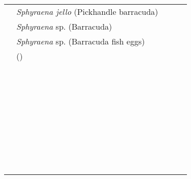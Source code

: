 \documentclass[12pt]{article}
\begin{document}
\begin{longtable}{  p{2cm} p{3cm}  p{4.5cm}  p{2cm}  p{3cm}  }
 & \emph{Sphyraena jello}  (Pickhandle barracuda) &  &  & \\
 & \emph{Sphyraena} sp. (Barracuda) &  &  & \\
 & \emph{Sphyraena} sp. (Barracuda fish eggs) &  &  & \\
 &  \emph{} () &  &  & \\
  &  \emph{} &  &  & \\
  & \emph{}  &  &  & \\
  & \emph{} &  &  & \\
  &  \emph{} &  &  & \\
  & \emph{}  &  &  & \\
  & \emph{} &  &  & \\
  &  \emph{} &  &  & \\
  & \emph{}  &  &  & \\
  & \emph{} &  &  & \\
  &  \emph{} &  &  & \\
  & \emph{}  &  &  & \\
  & \emph{} &  &  & \\
  &  \emph{} &  &  & \\
  & \emph{}  &  &  & \\
  & \emph{} &  &  & \\
  &  \emph{} &  &  & \\
  & \emph{}  &  &  & \\
  & \emph{} &  &  & \\
  &  \emph{} &  &  & \\
  & \emph{}  &  &  & \\
  & \emph{} &  &  & \\
  &  \emph{} &  &  & \\
  & \emph{}  &  &  & \\
  & \emph{} &  &  & \\
  &  \emph{} &  &  & \\
  & \emph{}  &  &  & \\
  & \emph{} &  &  & \\
  &  \emph{} &  &  & \\
  & \emph{}  &  &  & \\
  & \emph{} &  &  & \\
  &  \emph{} &  &  & \\
  & \emph{}  &  &  & \\
  & \emph{} &  &  & \\
  &  \emph{} &  &  & \\
  & \emph{}  &  &  & \\
  & \emph{} &  &  & \\

\end{longtable}
\end{document}
